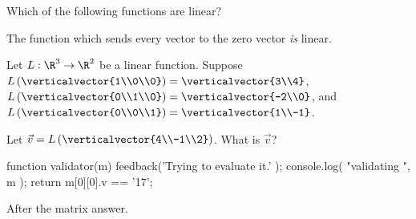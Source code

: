 \documentclass{ximera}
\begin{document}
\begin{question}
  Which of the following functions are linear?
  \begin{solution}
    \begin{multiple-choice}
    \end{multiple-choice}
  \end{solution}

  The function which sends every vector to the zero vector \textit{is} linear.
\end{question}
	
\begin{question}
  Let $L:\R^3 \to \R^2$ be a linear function.  Suppose
  $L\left(\verticalvector{1\\0\\0}\right) = \verticalvector{3\\4}$,
  $L\left(\verticalvector{0\\1\\0}\right) = \verticalvector{-2\\0}$,
  and $L\left(\verticalvector{0\\0\\1}\right) =
  \verticalvector{1\\-1}$.
  
  \begin{solution}
    Let $\vec{v} = L \left(\verticalvector{4\\-1\\2}\right)$.  What is $\vec{v}$?

    \begin{matrix-answer}[name=v]
      function validator(m) {
        feedback('Trying to evaluate it.' );
        console.log( "validating ", m );
        return m[0][0].v == '17';
      }
    \end{matrix-answer}
    
  \end{solution}

  After the matrix answer.
\end{question}
\end{document}
